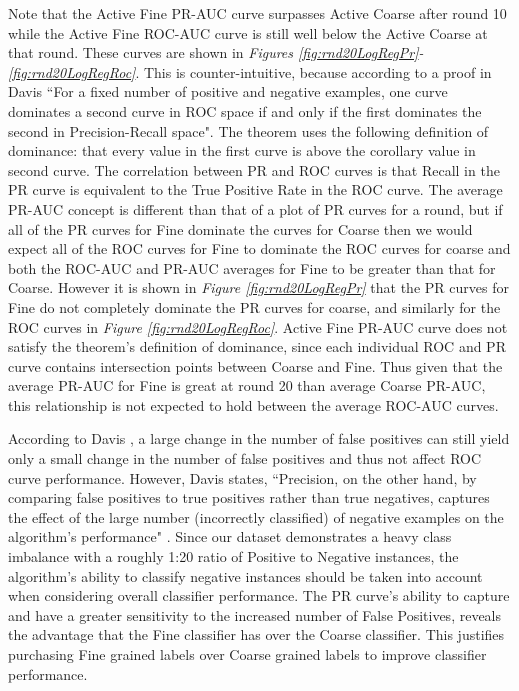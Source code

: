 \documentclass[ms]{nuthesis}
\begin{document}
\par Note that the Active Fine PR-AUC curve
surpasses Active Coarse after round 10 while the Active Fine ROC-AUC curve is still well below the
 Active Coarse at that round. These curves are shown in \textit{Figures \ref{fig:rnd20LogRegPr}-
 \ref{fig:rnd20LogRegRoc}}. This is counter-intuitive, because according to a proof in Davis \cite{DavisRocPr}
 ``For a fixed number of positive and negative examples, one curve dominates a second curve in
 ROC space if and only if the first dominates the second in Precision-Recall space". The theorem uses the
 following definition of dominance: that every value in the first curve is above the corollary value in
 second curve. The correlation between PR and ROC curves is that Recall in the PR curve is equivalent to
 the True Positive Rate in the ROC curve. The average PR-AUC concept is different than that of a plot of
 PR curves for a round, but if all of the PR curves for Fine dominate the curves for Coarse then we would
  expect all of the ROC curves for Fine to dominate the ROC curves for coarse and both the ROC-AUC and PR-AUC
   averages for Fine to be greater than that for Coarse. However it is shown in \textit{Figure \ref{fig:rnd20LogRegPr}}
   that the PR curves for Fine do not completely dominate the PR curves for coarse, and similarly for the ROC curves
   in \textit{Figure \ref{fig:rnd20LogRegRoc}}. Active Fine PR-AUC curve does not satisfy the theorem's
   definition of dominance, since each individual ROC and PR curve contains intersection points between
   Coarse and Fine. Thus given that the average PR-AUC for Fine is great at round 20 than average Coarse PR-AUC,
   this relationship is not expected to hold between the average ROC-AUC curves.
   \par According to Davis \cite{DavisRocPr}, a large change in the number of false positives can still yield
   only a small change in the number of false positives and thus not affect ROC curve performance. However,
   Davis states, ``Precision, on the other hand, by comparing false positives to true positives rather than true
   negatives, captures the effect of the large number (incorrectly classified) of negative examples on the
   algorithm's performance" \cite{DavisRocPr}. Since our dataset demonstrates a heavy class imbalance with
    a roughly 1:20 ratio of Positive to Negative instances, the algorithm's ability to classify negative instances
    should be taken into account when considering overall classifier performance. The PR curve's ability to capture
    and have a greater sensitivity to the increased number of False Positives, reveals the advantage that the Fine
    classifier has over the Coarse classifier. This justifies purchasing Fine grained labels over Coarse grained labels
    to improve classifier performance.
\end{document}
